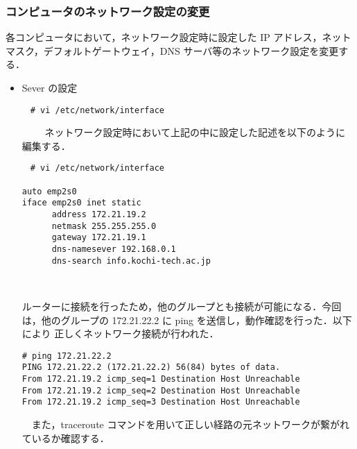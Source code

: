 \documentclass[a4j,titlepage]{jarticle}
\begin{document}
\subsubsection{コンピュータのネットワーク設定の変更}
各コンピュータにおいて，ネットワーク設定時に設定した IP アドレス，ネットマスク，デフォルトゲートウェイ，DNS サーバ等のネットワーク設定を変更する．
\begin{itemize}
\item Sever の設定\\
  \begin{center}
    \begin{screen}
\begin{verbatim}
　# vi /etc/network/interface
\end{verbatim}
    \end{screen}
  \end{center}　
  　ネットワーク設定時において上記の中に設定した記述を以下のように編集する．

  \begin{center}
    \begin{screen}
\begin{verbatim}
　# vi /etc/network/interface

auto emp2s0
iface emp2s0 inet static
      address 172.21.19.2
      netmask 255.255.255.0
      gateway 172.21.19.1
      dns-namesever 192.168.0.1
      dns-search info.kochi-tech.ac.jp
\end{verbatim}
    \end{screen}
  \end{center}　
  
  ルーターに接続を行ったため，他のグループとも接続が可能になる．今回は，他のグループの 172.21.22.2 に ping を送信し，動作確認を行った．以下により 正しくネットワーク接続が行われた．

\begin{center}
  \begin{screen}
\begin{verbatim}
# ping 172.21.22.2
PING 172.21.22.2 (172.21.22.2) 56(84) bytes of data.
From 172.21.19.2 icmp_seq=1 Destination Host Unreachable
From 172.21.19.2 icmp_seq=2 Destination Host Unreachable
From 172.21.19.2 icmp_seq=3 Destination Host Unreachable
\end{verbatim}
  \end{screen}
\end{center}

　また，traceroute コマンドを用いて正しい経路の元ネットワークが繋がれているか確認する．


\end{itemize}
\end{document}

